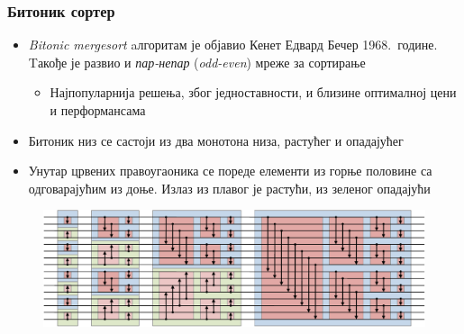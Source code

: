 \begin{frame}
\frametitle{Битоник сортер}
 \begin{itemize}
  \item \textit{Bitonic mergesort} aлгоритам је објавио Кенет Едвард Бечер 1968.\ године. Tакође је развио и \textit{пар-непар} (\textit{odd-even}) мреже за сортирање
  \begin{itemize}
   \item Најпопуларнија решења, због једноставности, и близине оптималној цени и перформансама
  \end{itemize}
  \item \alert{Битоник низ} се састоји из два монотона низа, растућег и опадајућег
  \item Унутар црвених правоугаоника се пореде елементи из горње половине са одговарајућим из доње. Излаз из плавог је растући, из зеленог опадајући
 \end{itemize}
\begin{figure}[H]
  \centering
      \includegraphics[scale=0.35]{slike/BitonicSort1.pdf}
 \end{figure}
\end{frame}


